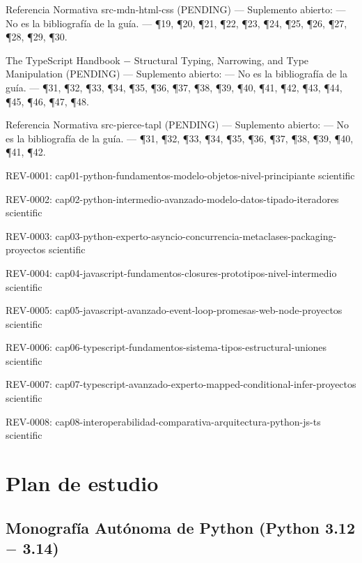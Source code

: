 \documentclass{book}
\begin{document}
\noindent Referencia Normativa src-mdn-html-css (PENDING) --- Suplemento abierto: --- No es la bibliografía de la guía. --- \P19, \P20, \P21, \P22, \P23, \P24, \P25, \P26, \P27, \P28, \P29, \P30.

\noindent The TypeScript Handbook \(-\) Structural Typing, Narrowing, and Type Manipulation (PENDING) --- Suplemento abierto: --- No es la bibliografía de la guía. --- \P31, \P32, \P33, \P34, \P35, \P36, \P37, \P38, \P39, \P40, \P41, \P42, \P43, \P44, \P45, \P46, \P47, \P48.

\noindent Referencia Normativa src-pierce-tapl (PENDING) --- Suplemento abierto: --- No es la bibliografía de la guía. --- \P31, \P32, \P33, \P34, \P35, \P36, \P37, \P38, \P39, \P40, \P41, \P42.

\noindent REV-0001: cap01-python-fundamentos-modelo-objetos-nivel-principiante scientific

\noindent REV-0002: cap02-python-intermedio-avanzado-modelo-datos-tipado-iteradores scientific

\noindent REV-0003: cap03-python-experto-asyncio-concurrencia-metaclases-packaging-proyectos scientific

\noindent REV-0004: cap04-javascript-fundamentos-closures-prototipos-nivel-intermedio scientific

\noindent REV-0005: cap05-javascript-avanzado-event-loop-promesas-web-node-proyectos scientific

\noindent REV-0006: cap06-typescript-fundamentos-sistema-tipos-estructural-uniones scientific

\noindent REV-0007: cap07-typescript-avanzado-experto-mapped-conditional-infer-proyectos scientific

\noindent REV-0008: cap08-interoperabilidad-comparativa-arquitectura-python-js-ts scientific
\chapter{Plan de estudio}

\section*{Monografía Autónoma de Python (Python 3.12 \(-\) 3.14)}
\end{document}
